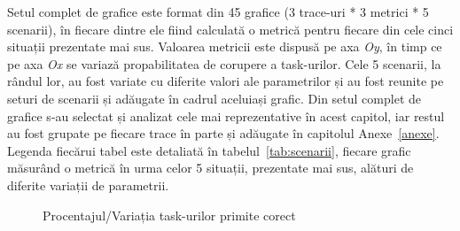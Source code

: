 \documentclass[12pt,a4paper]{report}
\begin{document}
Setul complet de grafice este format din 45 grafice  (3 trace-uri * 3 metrici * 5 scenarii), în fiecare dintre ele fiind calculată o metrică pentru fiecare din cele cinci situații prezentate mai sus. Valoarea metricii este dispusă pe axa \textit{Oy}, în timp ce pe axa \textit{Ox} se variază propabilitatea de corupere a task-urilor. Cele 5 scenarii, la rândul lor, au fost variate cu diferite valori ale parametrilor și au fost reunite pe seturi de scenarii și adăugate în cadrul aceluiași grafic. Din setul complet de grafice s-au selectat și analizat cele mai reprezentative în acest capitol, iar restul au fost grupate pe fiecare trace în parte și adăugate în capitolul Anexe~\ref{anexe}. Legenda fiecărui tabel este detaliată în tabelul~\ref{tab:scenarii}, fiecare grafic măsurând o metrică în urma celor 5 situații, prezentate mai sus, alături de diferite variații de parametrii.

\begin{figure}%
    \centering
    \qquad
    \caption{Procentajul/Variația task-urilor primite corect}%
    \label{fig:metric1HCMM}%
\end{figure}
\end{document}
